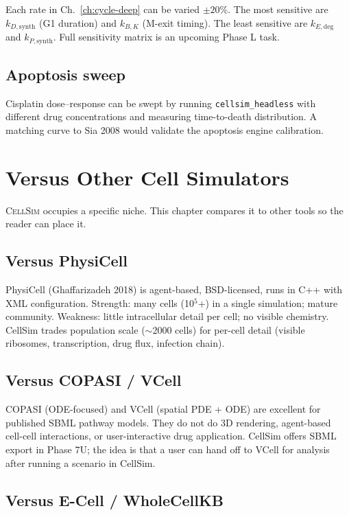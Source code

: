 \documentclass[11pt,letterpaper,twoside,openany]{book}
\newcommand{\code}[1]{\texttt{#1}}
\begin{document}
Each rate in Ch.~\ref{ch:cycle-deep} can be varied $\pm 20\%$. The
most sensitive are $k_{D,\text{synth}}$ (G1 duration) and
$k_{B,K}$ (M-exit timing). The least sensitive are
$k_{E,\text{deg}}$ and $k_{P,\text{synth}}$. Full sensitivity
matrix is an upcoming Phase L task.

\section{Apoptosis sweep}

Cisplatin dose--response can be swept by running
\code{cellsim\_headless} with different drug concentrations and
measuring time-to-death distribution. A matching curve to Sia 2008
would validate the apoptosis engine calibration.

\chapter{Versus Other Cell Simulators}
\label{ch:versus}

\textsc{CellSim} occupies a specific niche. This chapter compares
it to other tools so the reader can place it.

\section{Versus PhysiCell}

PhysiCell (Ghaffarizadeh 2018) is agent-based, BSD-licensed, runs
in C++ with XML configuration. Strength: many cells (10$^5$+) in a
single simulation; mature community. Weakness: little
intracellular detail per cell; no visible chemistry. CellSim trades
population scale ($\sim$2000 cells) for per-cell detail (visible
ribosomes, transcription, drug flux, infection chain).

\section{Versus COPASI / VCell}

COPASI (ODE-focused) and VCell (spatial PDE + ODE) are excellent
for published SBML pathway models. They do not do 3D rendering,
agent-based cell-cell interactions, or user-interactive drug
application. CellSim offers SBML export in Phase 7U; the idea is
that a user can hand off to VCell for analysis after running a
scenario in CellSim.

\section{Versus E-Cell / WholeCellKB}
\end{document}
